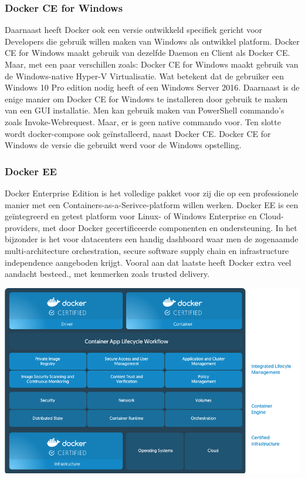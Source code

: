 \subsubsection{Docker CE for Windows}
Daarnaast heeft Docker ook een versie ontwikkeld specifiek gericht voor Developers die gebruik willen maken van Windows als ontwikkel platform. Docker CE for Windows maakt gebruik van dezelfde Daemon en Client als Docker CE. Maar, met een paar verschillen zoals: Docker CE for Windows maakt gebruik van de Windows-native Hyper-V Virtualisatie. Wat betekent dat de gebruiker een Windows 10 Pro edition nodig heeft of een Windows Server 2016. Daarnaast is de enige manier om Docker CE for Windows te installeren door gebruik te maken van een GUI installatie. Men kan gebruik maken van PowerShell commando's zoals Invoke-Webrequest. Maar, er is geen native commando voor. Ten slotte wordt docker-compose ook geïnstalleerd, naast Docker CE. Docker CE for Windows de versie die gebruikt werd voor de Windows opstelling.


\subsubsection{Docker EE}
Docker Enterprise Edition is het volledige pakket voor zij die op een professionele manier met een Containers-as-a-Serivce-platform willen werken. Docker EE is een geïntegreerd en getest platform voor Linux- of Windows Enterprise en Cloud-providers, met door Docker gecertificeerde componenten en ondersteuning. In het bijzonder is het voor datacenters een handig dashboard waar men de zogenaamde multi-architecture orchestration, secure software supply chain en infrastructure independence aangeboden krijgt. Vooral aan dat laatste heeft Docker extra veel aandacht besteed., met kenmerken zoals trusted delivery.

\begin{center}
	\includegraphics[scale=0.2]{img/dockerce.png}
\end{center}

